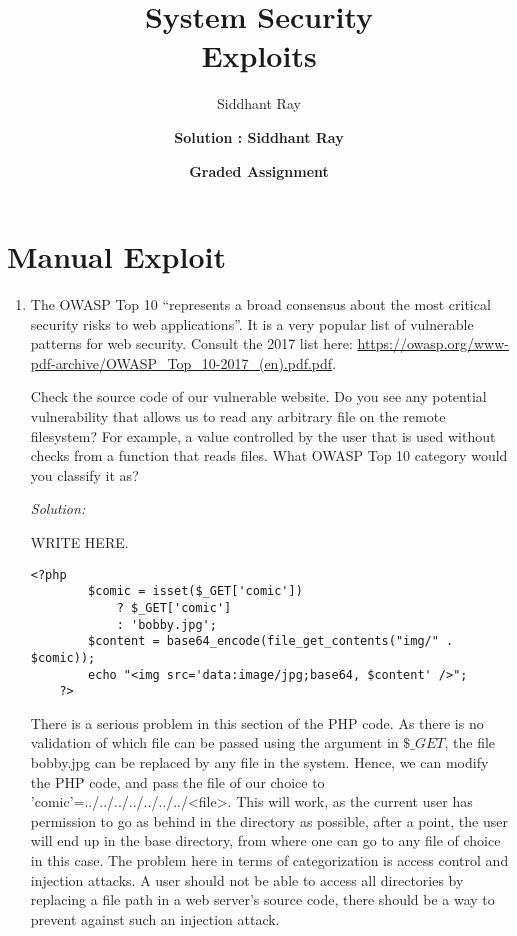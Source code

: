 \documentclass[a4paper,11pt]{article}
\title{System Security\\
Exploits}
\author{Siddhant Ray}
\author{\bf Solution : Siddhant Ray}
\author{\bf Graded Assignment}
\newenvironment{solution}%
{\par{\noindent\small\textit{Solution:}}\vspace{-12pt}\begin{framed}}%
{\end{framed}\par}
\begin{document}
\maketitle

\section{Manual Exploit}

\begin{enumerate}
	\item The OWASP Top 10 ``represents a broad consensus about the most critical security risks to web applications''. It is a very popular list of vulnerable patterns for web security. Consult the 2017 list here: \url{https://owasp.org/www-pdf-archive/OWASP_Top_10-2017_(en).pdf.pdf}.
	
	Check the source code of our vulnerable website. Do you see any potential vulnerability that allows us to read any arbitrary file on the remote filesystem? For example, a value controlled by the user that is used without checks from a function that reads files. What OWASP Top 10 category would you classify it as?
	
	\ifsolution\begin{solution}
WRITE HERE.
\begin{verbatim}
<?php
        $comic = isset($_GET['comic'])
            ? $_GET['comic']
            : 'bobby.jpg';
        $content = base64_encode(file_get_contents("img/" . $comic));
        echo "<img src='data:image/jpg;base64, $content' />";
    ?>
\end{verbatim}

There is a serious problem in this section of the PHP code. As there is no validation of which file can be passed using the argument in $\$\_GET$, the file bobby.jpg can be replaced by any file in the system. Hence, we can modify the PHP code, and pass the file of our choice to 'comic'=../../../../../../../<file>. This will work, as the current user has permission to go as behind in the directory as possible, after a point, the user will end up in the base directory, from where one can go to any file of choice in this case. The problem here in terms of categorization is access control and injection attacks. A user should not be able to access all directories by replacing a file path in a web server's source code, there should be a way to prevent against such an injection attack.

\end{solution}\fi



\end{enumerate}
\end{document}
